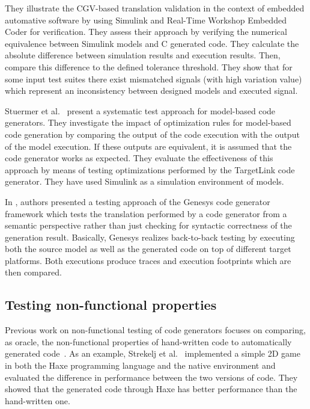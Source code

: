 They illustrate the CGV-based translation validation in the context of embedded automative software by using Simulink and Real-Time Workshop Embedded Coder for verification. They assess their approach by verifying the numerical equivalence between Simulink models and C generated code. They calculate the absolute difference between simulation results and execution results. Then, compare this difference to the defined tolerance threshold. They show that for some input test suites there exist mismatched signals (with high variation value) which represent an inconsistency between designed models and executed signal.








Stuermer et al.~\cite{stuermer2007systematic} present a systematic test approach for model-based code generators. They investigate the impact of optimization rules for model-based code generation by comparing the output of the code execution with the output of the model execution. 
If these outputs are equivalent, it is assumed that the code generator works as expected. 
They evaluate the effectiveness of this approach by means of testing optimizations performed by the TargetLink code generator. 
They have used Simulink as a simulation environment of models. 




In \cite{jorges2014back}, authors presented a testing approach of the Genesys code generator framework which tests the translation performed by a code generator from a semantic perspective rather than just checking for syntactic correctness of the generation result. Basically,
Genesys realizes back-to-back testing by executing both the source model as well as the generated code on top of different target platforms. Both executions produce traces and execution footprints which are then compared.



\subsection{Testing non-functional properties}
Previous work on non-functional testing of code generators focuses on comparing, as oracle, the non-functional properties of hand-written code to automatically generated code~\cite{stepasyuk2015evaluating,richard2013efficient}. As an example, Strekelj et al.~\cite{vstrekelj2015performance} implemented a simple 2D game in both the Haxe programming language and the native environment and evaluated the difference in performance between the two versions of code. They showed that the generated code through Haxe has better performance than the hand-written one. 

